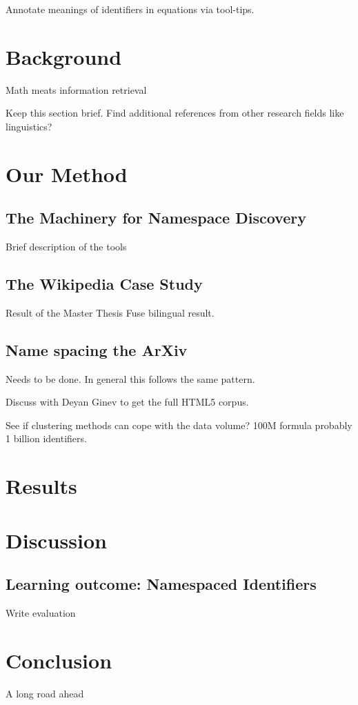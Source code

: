 \documentclass{sig-alternate-2013}
\begin{document}
Annotate meanings of identifiers in equations via tool-tips.



\section{Background}
Math meats information retrieval

Keep this section brief. Find additional references from other research fields like linguistics?

\section{Our Method}
\subsection{The Machinery for Namespace Discovery}
Brief description of the tools
\subsection{The Wikipedia Case Study}
Result of the Master Thesis
Fuse bilingual result.
\subsection{Name spacing the ArXiv}
Needs to be done. In general this follows the same pattern.

Discuss with Deyan Ginev to get the full HTML5 corpus.

See if clustering methods can cope with the data volume? 100M formula probably 1 billion identifiers.
\section{Results}
\section{Discussion}
\subsection{Learning outcome: Namespaced Identifiers}
Write evaluation

\section{Conclusion}

A long road ahead
\end{document}
